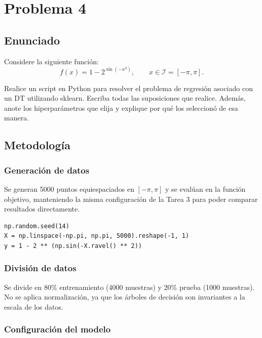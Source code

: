 \documentclass{article}
\begin{document}
\section{Problema 4}

\subsection{Enunciado}

Considere la siguiente función:
\[
f(x)=1-2^{\sin(-x^{2})}, \qquad x \in \mathcal{I} = [-\pi,\pi].
\]

Realice un script en Python para resolver el problema de regresión asociado con un DT utilizando sklearn. Escriba todas las suposiciones que realice. Además, anote los hiperparámetros que elija y explique por qué los seleccionó de esa manera.

\subsection{Metodología}

\subsubsection{Generación de datos}

Se generan 5000 puntos equiespaciados en $[-\pi, \pi]$ y se evalúan en la función objetivo, manteniendo la misma configuración de la Tarea 3 para poder comparar resultados directamente.

\begin{lstlisting}
np.random.seed(14)
X = np.linspace(-np.pi, np.pi, 5000).reshape(-1, 1)
y = 1 - 2 ** (np.sin(-X.ravel() ** 2))
\end{lstlisting}

\subsubsection{División de datos}

Se divide en 80\% entrenamiento (4000 muestras) y 20\% prueba (1000 muestras). No se aplica normalización, ya que los árboles de decisión son invariantes a la escala de los datos.

\subsubsection{Configuración del modelo}
\end{document}
